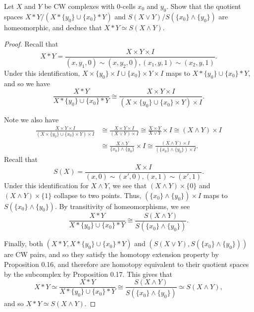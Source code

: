 \documentclass[12pt]{article}
\theoremstyle{remark}
\begin{document}
\setcounter{subsubsection}{23}
\begin{problem}
  Let $X$ and $Y$ be CW complexes with $0$-cells $x_0$ and $y_0$. Show that the quotient spaces $X \ast Y/(X \ast \{y_0\} \cup \{x_0\} \ast Y)$ and $S(X \vee Y)/S(\{x_0\} \wedge \{y_0\})$ are homeomorphic, and deduce that $X \ast Y \simeq S(X \wedge Y)$.
\end{problem}
\begin{proof}
  Recall that
  \begin{equation*}
    X \ast Y = \frac{X \times Y \times I}{(x,y_1,0) \sim (x,y_2,0), (x_1,y,1)\sim(x_2,y,1)}.
  \end{equation*}
  Under this identification, $X \times \{y_0\} \times I \cup \{x_0\} \times Y \times I$ maps to $X \ast \{y_0\} \cup \{x_0\} \ast Y$, and so we have
  \begin{equation*}
    \frac{X \ast Y}{X \ast \{y_0\} \cup \{x_0\} \ast Y} \cong \frac{X \times Y \times I}{(X \times \{y_0\} \cup \{x_0\} \times Y) \times I}.
  \end{equation*}
  \par Note we also have
  \begin{align*}
    \frac{X \times Y \times I}{(X \times \{y_0\} \cup \{x_0\} \times Y) \times I} &\cong \frac{X \times Y \times I}{(X \vee Y) \times I}
    \cong \frac{X \times Y}{X \vee Y} \times I \cong (X \wedge Y) \times I\\
    &\cong \frac{X \wedge Y}{\{x_0\} \wedge \{y_0\}} \times I \cong \frac{(X \wedge Y) \times I}{(\{x_0\} \wedge \{y_0\}) \times I}.
  \end{align*}
  Recall that
  \begin{equation*}
    S(X) = \frac{X \times I}{(x,0) \sim (x',0), (x,1) \sim (x',1)}.
  \end{equation*}
  Under this identification for $X \wedge Y$, we see that $(X \wedge Y) \times \{0\}$ and $(X \wedge Y) \times \{1\}$ collapse to two points. Thus, $(\{x_0\} \wedge \{y_0\}) \times I$ maps to $S(\{x_0\} \wedge \{y_0\})$. By transitivity of homeomorphisms, we see
  \begin{equation*}
    \frac{X \ast Y}{X \ast \{y_0\} \cup \{x_0\} \ast Y} \cong \frac{S(X \wedge Y)}{S(\{x_0\} \wedge \{y_0\})}.
  \end{equation*}
  \par Finally, both $(X \ast Y,X \ast \{y_0\} \cup \{x_0\} \ast Y)$ and $(S(X \vee Y),S(\{x_0\} \wedge \{y_0\}))$ are CW pairs, and so they satisfy the homotopy extension property by Proposition 0.16, and therefore are homotopy equivalent to their quotient spaces by the subcomplex by Proposition 0.17. This gives that
  \begin{equation*}
    X \ast Y \simeq \frac{X \ast Y}{X \ast \{y_0\} \cup \{x_0\} \ast Y} \cong \frac{S(X \wedge Y)}{S(\{x_0\} \wedge \{y_0\})} \simeq S(X \wedge Y),
  \end{equation*}
  and so $X \ast Y \simeq S(X \wedge Y)$.
\end{proof}

\endgroup
\printbibliography
\cleardoublepage
{}
\renewcommand*\contentsname{List of Solved Exercises}
{\footnotesize\tableofcontents}
\end{document}
